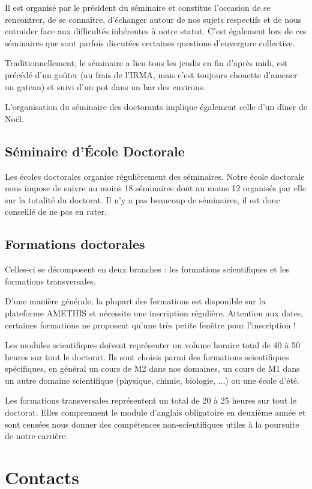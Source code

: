 \documentclass[a5paper]{article}
\begin{document}
\vspace{1em}

Il est organisé par le président du séminaire et constitue l'occasion de se rencontrer, de se connaître, d'échanger autour de nos sujets respectifs et de nous entraider face aux difficultés inhérentes à notre statut. C'est également lors de ces séminaires que sont parfois discutées certaines questions d'envergure collective.

Traditionnellement, le séminaire a lieu tous les jeudis en fin d'après midi, est précédé d'un goûter (au frais de l'IRMA, mais c'est toujours chouette d'amener un gateau) et suivi d'un pot dans un bar des environs.

\vspace{1em}

L'organisation du séminaire des doctorants implique également celle d'un dîner de Noël.

\subsection{Séminaire d'École Doctorale}
\label{sec:semin-decole-doct}

Les écoles doctorales organise régulièrement des séminaires. Notre école doctorale nous impose de suivre au moins 18 séminaires dont au moins 12 organisés par elle sur la totalité du doctorat. Il n'y a pas beaucoup de séminaires, il est donc conseillé de ne pas en rater.

\subsection{Formations doctorales}
\label{sec:form-doct}

Celles-ci se décomposent en deux branches : les formations scientifiques et les formations transversales.

D'une manière générale, la plupart des formations est disponible sur la plateforme AMETHIS et nécessite une inscription régulière. Attention aux dates, certaines formations ne proposent qu'une très petite fenêtre pour l'inscription !

\vspace{1em}

Les modules scientifiques doivent représenter un volume horaire total de 40 à 50 heures sur tout le doctorat. Ils sont choisis parmi des formations scientifiques spécifiques, en général un cours de M2 dans nos domaines, un cours de M1 dans un autre domaine scientifique (physique, chimie, biologie, ...) ou une école d'été.

\vspace{1em}

Les formations transversales représentent un total de 20 à 25 heures sur tout le doctorat. Elles comprennent le module d'anglais obligatoire en deuxième année et sont censées nous donner des compétences non-scientifiques utiles à la poursuite de notre carrière.

\appendix

\section{Contacts}
\label{sec:contacts}
\end{document}
